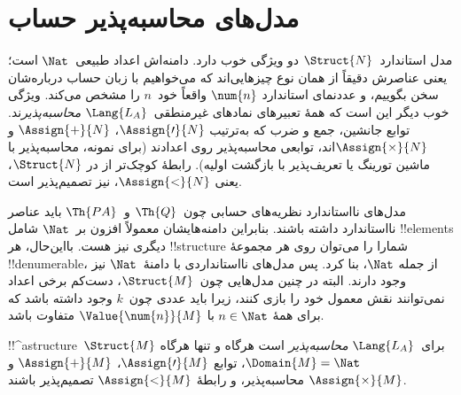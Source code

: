 \documentclass[../../../include/open-logic-section]{subfiles}
\begin{document}
\section{مدل‌های محاسبه‌پذیر حساب}

\begin{explain}
مدل استاندارد~$\Struct{N}$ دو ویژگی خوب دارد. دامنه‌اش اعداد
طبیعی~$\Nat$ است؛ یعنی عناصرش دقیقاً از همان نوع چیزهایی‌اند که
می‌خواهیم با زبان حساب درباره‌شان سخن بگوییم، و عددنمای استاندارد
$\num{n}$ واقعاً خود~$n$ را مشخص می‌کند. ویژگی خوب دیگر این است که
همهٔ تعبیرهای نمادهای غیرمنطقی~$\Lang{L_A}$
\emph{محاسبه‌پذیر}ند. توابع جانشین، جمع و ضرب که به‌ترتیب
$\Assign{\prime}{N}$، $\Assign{+}{N}$ و $\Assign{\times}{N}$اند،
توابعی محاسبه‌پذیر روی اعدادند (برای نمونه، محاسبه‌پذیر با ماشین
تورینگ یا تعریف‌پذیر با بازگشت اولیه). رابطهٔ کوچک‌تر از در
$\Struct{N}$، یعنی $\Assign{<}{N}$، نیز تصمیم‌پذیر است.

مدل‌های نااستاندارد نظریه‌های حسابی چون~$\Th{Q}$ و~$\Th{PA}$ باید
عناصر نااستاندارد داشته باشند. بنابراین دامنه‌هایشان معمولاً افزون
بر~$\Nat$ شامل !!{element}s دیگری نیز هست. بااین‌حال، هر
!!{structure} شمارا را می‌توان روی هر مجموعهٔ !!{denumerable}، از جمله
$\Nat$، بنا کرد. پس مدل‌های نااستانداردی با دامنهٔ~$\Nat$ نیز وجود
دارند. البته در چنین مدل‌هایی چون~$\Struct{M}$، دست‌کم برخی اعداد
نمی‌توانند نقش معمول خود را بازی کنند، زیرا باید عددی چون~$k$ وجود
داشته باشد که برای همهٔ $n \in \Nat$ با
$\Value{\num{n}}{M}$ متفاوت باشد.
\end{explain}

\begin{defn}
!!^a{structure}~$\Struct{M}$ برای~$\Lang{L_A}$
\emph{محاسبه‌پذیر} است هرگاه و تنها هرگاه
$\Domain{M} = \Nat$، توابع $\Assign{\prime}{M}$،
$\Assign{+}{M}$ و $\Assign{\times}{M}$ محاسبه‌پذیر، و رابطهٔ
$\Assign{<}{M}$ تصمیم‌پذیر باشند.
\end{defn}
\end{document}
